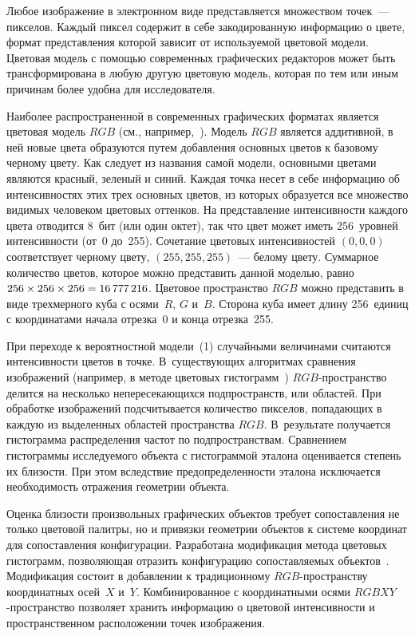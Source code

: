 \begin{multicols}{2}
  Любое изображение в электронном виде представляется множеством
  точек~--- пик\-се\-лов. Каждый пиксел содержит в себе закодированную
информацию о цвете, формат представления которой зависит от используемой
цветовой модели. Цветовая модель с помощью современных графических
редакторов может быть трансформирована в любую другую цветовую модель,
которая по тем или иным причинам более удобна для исследователя.

  Наиболее распространенной в современных графических форматах является
цветовая модель $RGB$ (см., например,~\cite{11-kuz, 10-kuz}). Модель $RGB$
является аддитивной, в ней новые цвета образуются путем добавления
основных цветов к базовому черному цвету. Как следует из названия самой
модели, основными цветами являются красный, зеленый и синий. Каждая точка
несет в себе информацию об интенсивностях этих трех основных цветов, из
которых образуется все множество видимых человеком цветовых оттенков. На
представление интенсивности каждого цвета отводится 8~бит (или один октет),
так что цвет может иметь 256~уровней интенсивности (от~0 до~255).
Сочетание цветовых интенсивностей $(0, 0, 0)$ соответствует черному цвету,
$(255, 255, 255)$~--- белому цвету. Суммарное количество цветов, которое
можно представить данной моделью, равно $256\times256\times256 \hm=
16\,777\,216$. Цветовое пространство $RGB$ можно представить в виде
трехмерного куба с осями~$R$, $G$ и~$B$. Сторона куба имеет длину
256~единиц с координатами начала отрезка~0 и конца отрезка~255.

  При переходе к вероятностной модели~(1) случайными величинами
считаются интенсивности цветов в точке. В~существующих алгоритмах
сравнения изображений (например, в методе цветовых
  гистограмм~\cite{11-kuz, 10-kuz}) $RGB$-про\-стран\-ст\-во делится на
несколько непересекающихся подпространств, или областей. При обработке
изображений подсчитывается количество пикселов, попадающих в каж\-дую из
выделенных областей пространства $RGB$. В~результате получается
гистограмма распределения час\-тот по подпространствам. Сравнением
гистограммы исследуемого объекта с гистограммой эталона оценивается
степень их близости. При этом вследствие предопределенности эталона
исключается необходимость отражения геометрии объекта.

  Оценка близости произвольных графических объектов требует
сопоставления не только цветовой палитры, но и привязки геометрии объектов
к сис\-те\-ме координат для сопоставления конфигурации. Разработана
модификация метода цветовых гистограмм, позволяющая отразить
конфигурацию сопоставляемых объектов~\cite{12-kuz}. Модификация состоит
в добавлении к традиционному $RGB$-про\-стран\-ст\-ву координатных
осей~$X$ и~$Y$. Комбинированное с координатными осями
  $RGBXY$-про\-стран\-ст\-во позволяет хранить информацию о цветовой
интенсивности и пространственном расположении точек изображения.


\end{multicols}
